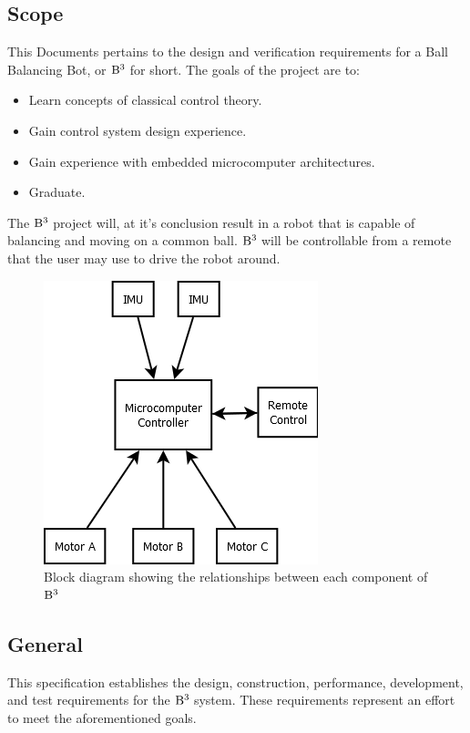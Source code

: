 \documentclass[12pt,a4paper]{article}
\newcommand{\BBB}{${\rm B}^3\;$}
\begin{document}
	\begin{flushleft}
		
		\section{Scope}
		This Documents pertains to the design and verification requirements for a Ball Balancing Bot, or \BBB for short. The goals of the project are to:
		\begin{itemize}
			\item Learn concepts of classical control theory.
			\item Gain control system design experience.
			\item Gain experience with embedded microcomputer architectures. 
			\item Graduate.
		\end{itemize}
		
		The \BBB project will, at it's conclusion result in a robot that is capable of balancing and moving on a common ball. \BBB will be controllable from a remote that the user may use to drive the robot around.
		
		\begin{figure}[h]
			\centering
			\includegraphics[width=.5\textwidth]{Images/Block-Diagram}
			\caption{Block diagram showing the relationships between each component of \BBB}
			\label{fig: Overview}
		\end{figure}
		
		\subsection{General}
		This specification establishes the design, construction, performance, development, and test requirements for the \BBB system. These requirements represent an effort to meet the aforementioned goals.
		

\end{flushleft}
\end{document}
